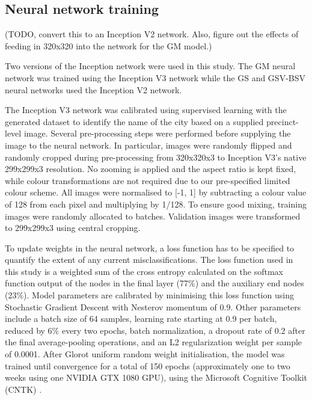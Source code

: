 \documentclass[10pt,letterpaper]{article}
\begin{document}
 \subsection*{Neural network training}\label{sec:methods4}    


(TODO, convert this to an Inception V2 network. Also, figure out the effects of feeding in 320x320 into the network for the GM model.)

Two versions of the Inception network were used in this study. The GM neural network was trained using the Inception V3 network while the GS and GSV-BSV neural networks used the Inception V2 network. 

The Inception V3 network was calibrated using supervised learning with the generated dataset to identify the name of the city based on a supplied precinct-level image. Several pre-processing steps were performed before supplying the image to the neural network. In particular, images were randomly flipped and randomly cropped during pre-processing from 320x320x3 to Inception V3's native 299x299x3 resolution. No zooming is applied and the aspect ratio is kept fixed, while colour transformations are not required due to our pre-specified limited colour scheme. All images were normalised to [-1, 1] by subtracting a colour value of 128 from each pixel and multiplying by 1/128. To ensure good mixing, training images were randomly allocated to batches. Validation images were transformed to 299x299x3 using central cropping.

To update weights in the neural network, a loss function has to be specified to quantify the extent of any current misclassifications. The loss function used in this study is a weighted sum of the cross entropy calculated on the softmax function output of the nodes in the final layer (77\%) and the auxiliary end nodes (23\%). Model parameters are calibrated by minimising this loss function using Stochastic Gradient Descent with Nesterov momentum of 0.9. Other parameters include a batch size of 64 samples, learning rate starting at 0.9 per batch, reduced by 6\% every two epochs, batch normalization, a dropout rate of 0.2 after the final average-pooling operations, and an L2 regularization weight per sample of 0.0001. After Glorot uniform random weight initialisation, the model was trained until convergence for a total of 150 epochs (approximately one to two weeks using one NVIDIA GTX 1080 GPU), using the Microsoft Cognitive Toolkit (CNTK) \cite{Yu2015}. 
\end{document}
